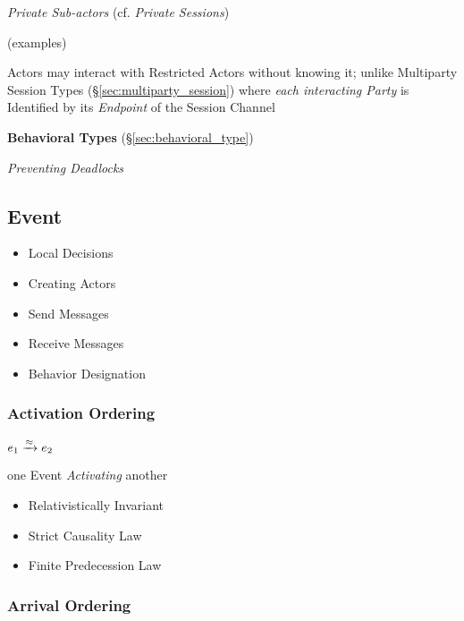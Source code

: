 \emph{Private Sub-actors} (cf. \emph{Private Sessions}) %

(examples) %

Actors may interact with Restricted Actors without knowing it; unlike
Multiparty Session Types (\S\ref{sec:multiparty_session}) where
\emph{each interacting Party} is Identified by its \emph{Endpoint} of
the Session Channel


\textbf{Behavioral Types} (\S\ref{sec:behavioral_type})

\emph{Preventing Deadlocks}


\endgroup



\subsection{Event}\label{sec:event}

\begin{itemize}
  \item Local Decisions
  \item Creating Actors
  \item Send Messages
  \item Receive Messages
  \item Behavior Designation
\end{itemize}



\subsubsection{Activation Ordering}\label{sec:activation_ordering}

$e_1 \xrightarrow{\approx} e_2$

one Event \emph{Activating} another

\begin{itemize}
  \item Relativistically Invariant
  \item Strict Causality Law
  \item Finite Predecession Law
\end{itemize}



\subsubsection{Arrival Ordering}\label{sec:arrival_ordering}

